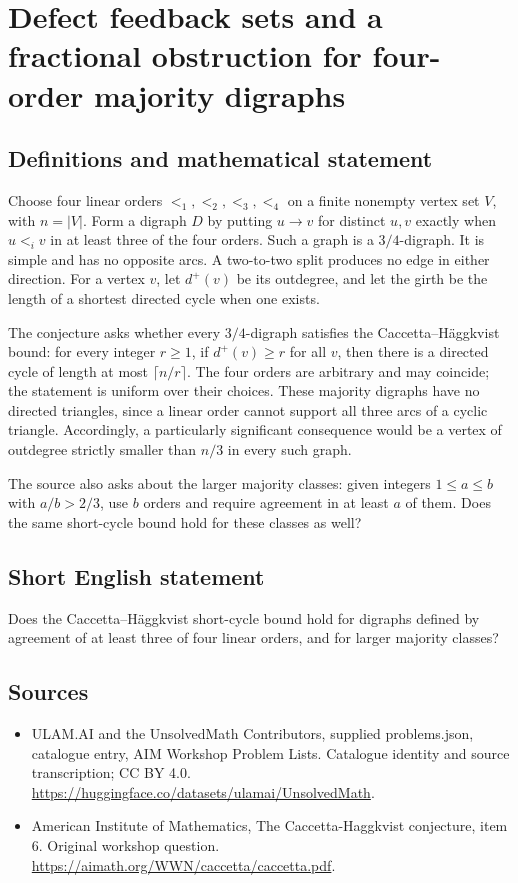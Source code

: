 \documentclass[11pt,a4paper]{article}
\begin{document}
\section*{Defect feedback sets and a fractional obstruction for four-order majority digraphs}\label{statement}

\subsection{Definitions and mathematical statement}
Choose four linear orders $<_1,<_2,<_3,<_4$ on a finite nonempty
vertex set $V$, with $n=|V|$. Form a digraph $D$ by putting
$u\to v$ for distinct $u,v$ exactly when $u<_i v$ in at least
three of the four orders. Such a graph is a $3/4$-digraph.
It is simple and has no opposite arcs. A two-to-two split produces
no edge in either direction. For a vertex $v$, let $d^+(v)$ be its
outdegree, and let the girth be the length of a shortest directed
cycle when one exists.

The conjecture asks whether every $3/4$-digraph satisfies the
Caccetta--H\"aggkvist bound: for every integer $r\ge1$, if
$d^+(v)\ge r$ for all $v$, then there is a directed cycle of length
at most $\lceil n/r\rceil$. The four orders are arbitrary and may
coincide; the statement is uniform over their choices.
These majority digraphs have no directed triangles, since a linear
order cannot support all three arcs of a cyclic triangle.
Accordingly, a particularly significant consequence would be a vertex
of outdegree strictly smaller than $n/3$ in every such graph.

The source also asks about the larger majority classes: given
integers $1\le a\le b$ with $a/b>2/3$, use $b$ orders and require
agreement in at least $a$ of them. Does the same short-cycle bound
hold for these classes as well?
\subsection{Short English statement}
Does the Caccetta–Häggkvist short-cycle bound hold for digraphs defined by agreement of at least three of four linear orders, and for larger majority classes?
\subsection{Sources}
\begin{itemize}
\item[S1] ULAM.AI and the UnsolvedMath Contributors, supplied problems.json, catalogue entry, AIM Workshop Problem Lists. Catalogue identity and source transcription; CC BY 4.0.
\url{https://huggingface.co/datasets/ulamai/UnsolvedMath}.
\item[S2] American Institute of Mathematics, The Caccetta-Haggkvist conjecture, item 6. Original workshop question.
\url{https://aimath.org/WWN/caccetta/caccetta.pdf}.
\end{itemize}
\end{document}
